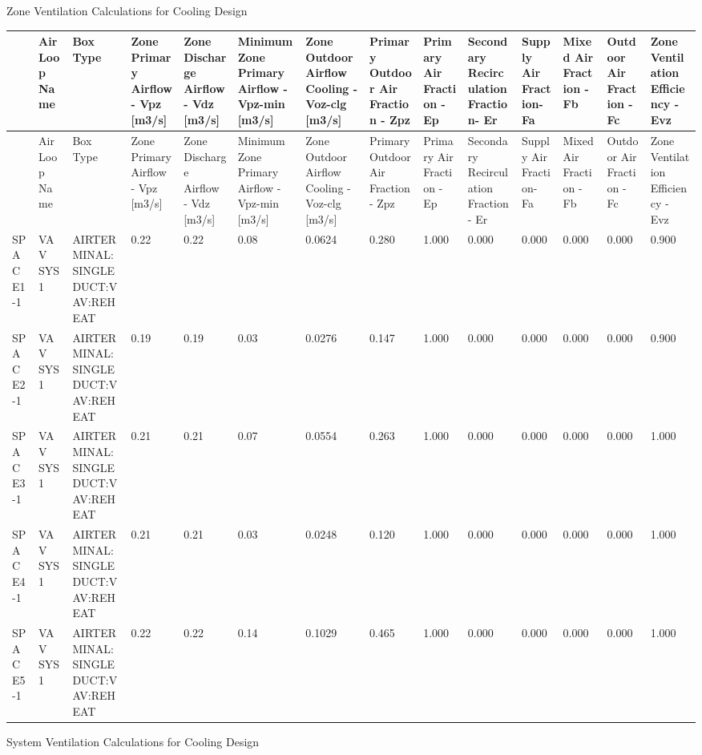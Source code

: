 Zone Ventilation Calculations for Cooling Design

{\tiny
\begin{longtable}[c]{p{0.42in}p{0.42in}p{0.42in}p{0.42in}p{0.42in}p{0.42in}p{0.42in}p{0.42in}p{0.42in}p{0.42in}p{0.42in}p{0.42in}p{0.42in}p{0.42in}}
\toprule
 & AirLoop Name & Box Type & Zone Primary Airflow - Vpz [m3/s] & Zone Discharge Airflow - Vdz [m3/s] & Minimum Zone Primary Airflow - Vpz-min [m3/s] & Zone Outdoor Airflow Cooling - Voz-clg [m3/s] & Primary Outdoor Air Fraction - Zpz & Primary Air Fraction - Ep & Secondary Recirculation Fraction- Er & Supply Air Fraction- Fa & Mixed Air Fraction - Fb & Outdoor Air Fraction - Fc & Zone Ventilation Efficiency - Evz \tabularnewline
\midrule
\endfirsthead

\toprule
 & AirLoop Name & Box Type & Zone Primary Airflow - Vpz [m3/s] & Zone Discharge Airflow - Vdz [m3/s] & Minimum Zone Primary Airflow - Vpz-min [m3/s] & Zone Outdoor Airflow Cooling - Voz-clg [m3/s] & Primary Outdoor Air Fraction - Zpz & Primary Air Fraction - Ep & Secondary Recirculation Fraction- Er & Supply Air Fraction- Fa & Mixed Air Fraction - Fb & Outdoor Air Fraction - Fc & Zone Ventilation Efficiency - Evz \tabularnewline
\midrule
\endhead

SPACE1-1 & VAV SYS 1 & AIRTERMINAL\-:SINGLEDUCT\-:VAV\-:REHEAT & 0.22 & 0.22 & 0.08 & 0.0624 & 0.280 & 1.000 & 0.000 & 0.000 & 0.000 & 0.000 & 0.900 \tabularnewline
SPACE2-1 & VAV SYS 1 & AIRTERMINAL\-:SINGLEDUCT\-:VAV\-:REHEAT & 0.19 & 0.19 & 0.03 & 0.0276 & 0.147 & 1.000 & 0.000 & 0.000 & 0.000 & 0.000 & 0.900 \tabularnewline
SPACE3-1 & VAV SYS 1 & AIRTERMINAL\-:SINGLEDUCT\-:VAV\-:REHEAT & 0.21 & 0.21 & 0.07 & 0.0554 & 0.263 & 1.000 & 0.000 & 0.000 & 0.000 & 0.000 & 1.000 \tabularnewline
SPACE4-1 & VAV SYS 1 & AIRTERMINAL\-:SINGLEDUCT\-:VAV\-:REHEAT & 0.21 & 0.21 & 0.03 & 0.0248 & 0.120 & 1.000 & 0.000 & 0.000 & 0.000 & 0.000 & 1.000 \tabularnewline
SPACE5-1 & VAV SYS 1 & AIRTERMINAL\-:SINGLEDUCT\-:VAV\-:REHEAT & 0.22 & 0.22 & 0.14 & 0.1029 & 0.465 & 1.000 & 0.000 & 0.000 & 0.000 & 0.000 & 1.000 \tabularnewline
\bottomrule
\end{longtable}}

System Ventilation Calculations for Cooling Design

